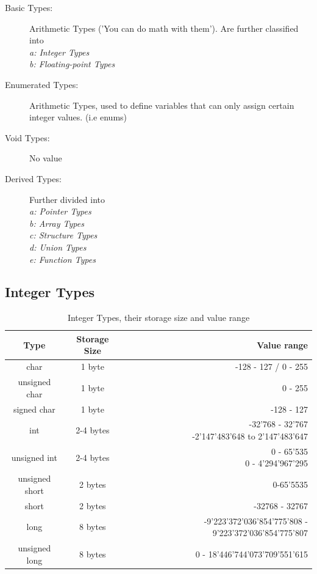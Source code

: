 \documentclass[a4paper, 11pt]{article}
\renewcommand*{\thead}[1]{\bfseries #1}
\begin{document}
\begin{description}
    \item[Basic Types: ] Arithmetic Types ('You can do math with them'). Are further classified into \\
        \textit{a: Integer Types} \\
        \textit{b: Floating-point Types}
    \item[Enumerated Types: ] Arithmetic Types, used to define variables that can only assign certain integer values. (i.e enums)
    \item[Void Types: ] No value
    \item[Derived Types: ] Further divided into \\
        \textit{a: Pointer Types} \\
        \textit{b: Array Types} \\
        \textit{c: Structure Types} \\
        \textit{d: Union Types} \\
        \textit{e: Function Types}
\end{description}

\subsection{Integer Types}

\begin{table}[htpb]
    \centering
    \caption{Integer Types, their storage size and value range}
    \label{tab:int-storage}
    \begin{tabular}{|c|c|r|}
        \hline
        \thead{Type} & \thead{Storage Size}  & \thead{Value range} \\
        \hline
        char & 1 byte & -128 - 127 / 0 - 255 \\
        \hline
        unsigned char & 1 byte & 0 - 255 \\
        \hline
        signed char & 1 byte & -128 - 127 \\
        \hline
        int & 2-4 bytes & \makecell{-32'768 - 32'767 \\ -2'147'483'648 to 2'147'483'647} \\
        \hline
        unsigned int & 2-4 bytes & \makecell{0 - 65'535 \\ 0 - 4'294'967'295} \\
        \hline
        unsigned short & 2 bytes  & 0-65'5535 \\
        \hline
        short & 2 bytes & -32768 - 32767 \\
        \hline
        long & 8 bytes & -9'223'372'036'854'775'808 -  9'223'372'036'854'775'807 \\
        \hline
        unsigned long & 8 bytes & 0 - 18'446'744'073'709'551'615 \\
        \hline
    \end{tabular}
\end{table}
\end{document}
